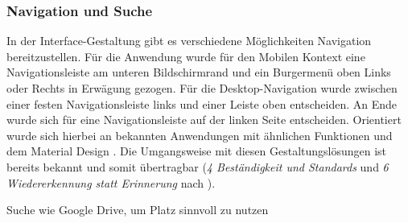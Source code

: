 \subsubsection{Navigation und Suche}
In der Interface-Gestaltung gibt es verschiedene Möglichkeiten Navigation bereitzustellen. Für die
Anwendung wurde für den Mobilen Kontext eine Navigationsleiste am unteren Bildschirmrand und ein
Burgermenü oben Links oder Rechts in Erwägung gezogen. Für die Desktop-Navigation wurde zwischen
einer festen Navigationsleiste links und einer Leiste oben entscheiden. An Ende wurde sich für eine
Navigationsleiste auf der linken Seite entscheiden. Orientiert wurde sich hierbei an bekannten
Anwendungen mit ähnlichen Funktionen und dem Material Design \cite{google_material_2022}. Die
Umgangsweise mit diesen Gestaltungslösungen ist bereits bekannt und somit übertragbar (\textit{4
Beständigkeit und Standards} und \textit{6 Wiedererkennung statt Erinnerung} nach
).

Suche wie Google Drive, um Platz sinnvoll zu nutzen

